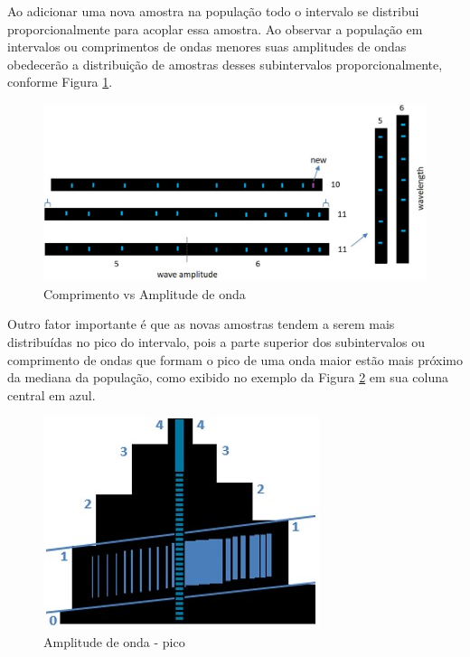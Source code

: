 Ao adicionar uma nova amostra na população todo o intervalo se distribui proporcionalmente para acoplar essa amostra. Ao observar a população em intervalos ou comprimentos de ondas menores suas amplitudes de ondas obedecerão a distribuição de amostras desses subintervalos proporcionalmente, conforme Figura \ref{fig:consciousness_space_volume_amplitude}.
	\begin{figure}[H]
	\caption{Comprimento vs Amplitude de onda}
	\label{fig:consciousness_space_volume_amplitude}
	\centering
	\includegraphics[scale=.4]{sections/images/consciousness_space_volume_amplitude.jpg}
	\end{figure}
	
Outro fator importante é que as novas amostras tendem a serem mais distribuídas no pico do intervalo, pois a parte superior dos subintervalos ou comprimento de ondas que formam o pico de uma onda maior estão mais próximo da mediana da população, como exibido no exemplo da Figura \ref{fig:consciousness_space_amplitude_growth} em sua coluna central em azul.
	\begin{figure}[H]
	\caption{Amplitude de onda - pico}
	\label{fig:consciousness_space_amplitude_growth}
	\centering
	\includegraphics[scale=.6]{sections/images/consciousness_space_amplitude_growth.jpg}
	\end{figure}

